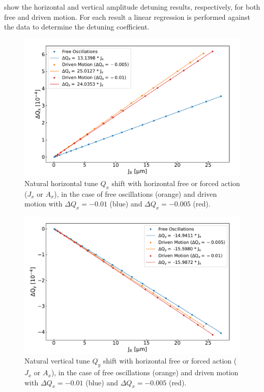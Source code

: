  show the horizontal and vertical amplitude detuning results, respectively, for both free and driven motion.
For each result a linear regression is performed against the data to determine the detuning coefficient.

\begin{figure}[!htb]
    \centering
    \includegraphics*[width=\textwidth]{Figures/Other_Studies/direct_detuning_driven_vs_free.pdf}
    \caption{Natural horizontal tune \(Q_x\) shift with horizontal free or forced action (\(J_x\) or \(A_x\)), in the case of free oscillations (\textcolor{mplorange}{orange}) and driven motion with \(\Delta Q_x = -0.01\) (\textcolor{mplblue}{blue}) and \(\Delta Q_x = -0.005\) (\textcolor{mplred}{red}).}
    \label{figure:horizontal_detuning_comparison}
\end{figure}

\begin{figure}[!htb]
    \centering
    \includegraphics*[width=\textwidth]{Figures/Other_Studies/cross_detuning_driven_vs_free.pdf}
    \caption{Natural vertical tune \(Q_y\) shift with horizontal free or forced action (\(J_x\) or \(A_x\)), in the case of free oscillations (\textcolor{mplorange}{orange}) and driven motion with \(\Delta Q_x = -0.01\) (\textcolor{mplblue}{blue}) and \(\Delta Q_x = -0.005\) (\textcolor{mplred}{red}).}
    \label{figure:vertical_detuning_comparison}
\end{figure}

